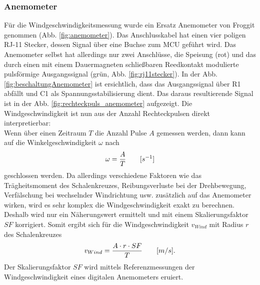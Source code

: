 \subsubsection{Anemometer}
{\begin{minipage}[b][650pt][t]{0.55\textwidth}
Für die Windgeschwindigkeitsmessung wurde ein Ersatz Anemometer von Froggit genommen (Abb. \ref{fig:anemometer}). Das Anschlusskabel hat einen vier poligen RJ-11 Stecker, dessen Signal über eine Buchse zum MCU geführt wird. Das Anemometer selbst hat allerdings nur zwei Anschlüsse, die Speisung (rot) und das durch einen mit einem Dauermagneten schließbaren Reedkontakt modulierte pulsförmige Ausgangssignal (grün, Abb. \ref{fig:rj11stecker}). In der Abb. \ref{fig:beschaltungAnemometer} ist ersichtlich, dass das Ausgangssignal über R1 abfällt und C1 als Spannungsstabilisierung dient. Das daraus resultierende Signal ist in der Abb. \ref{fig:rechteckpuls_anemometer} aufgezeigt. Die Windgeschwindigkeit ist nun aus der Anzahl Rechteckpulsen direkt interpretierbar:\\

Wenn über einen Zeitraum $T$ die Anzahl Pulse $A$ gemessen werden, dann kann auf die Winkelgeschwindigkeit $\omega$ nach 
\begin{equation}
\centering
\omega=\frac{A}{T}\qquad[s^{-1}]
\end{equation}
geschlossen werden. Da allerdings verschiedene Faktoren wie das Trägheitsmoment des Schalenkreuzes, Reibungsverluste bei der Drehbewegung, Verfälschung bei wechselnder Windrichtung usw. zusätzlich auf das Anemometer wirken, wird es sehr komplex die Windgeschwindigkeit exakt zu berechnen. Deshalb wird nur ein Näherungswert ermittelt und mit einem Skalierungsfaktor $SF$ korrigiert. Somit ergibt sich für die Windgeschwindigkeit $v_{Wind}$ mit Radius $r$ des Schalenkreuzes
\begin{equation}
\centering
v_{Wind} = \frac{A\cdot r\cdot SF}{T}\qquad[m/s].
\label{equ:berechnungWindgeschwindigkeit}
\end{equation}
Der Skalierungsfaktor $SF$ wird mittels Referenzmessungen der Windgeschwindigkeit eines digitalen Anemometers eruiert. \\
\end{minipage}}
